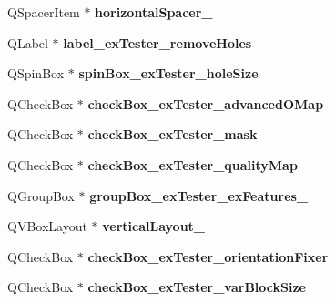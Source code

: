 \begin{DoxyCompactItemize}
\item 
\mbox{\label{class_ui___main_window_a8ab47ff95482ef95f4ec6ca4766b4f73}} 
Q\+Spacer\+Item $\ast$ {\bfseries horizontal\+Spacer\+\_}
\item 
\mbox{\label{class_ui___main_window_ad6729b2c4a64017c214cb48910162f0f}} 
Q\+Label $\ast$ {\bfseries label\+\_\+ex\+Tester\+\_\+remove\+Holes}
\item 
\mbox{\label{class_ui___main_window_a3288449518ceb42459d471718ca5e92b}} 
Q\+Spin\+Box $\ast$ {\bfseries spin\+Box\+\_\+ex\+Tester\+\_\+hole\+Size}
\item 
\mbox{\label{class_ui___main_window_ad98482ecaa124a0c9fc2b72c5a6f1ad9}} 
Q\+Check\+Box $\ast$ {\bfseries check\+Box\+\_\+ex\+Tester\+\_\+advanced\+O\+Map}
\item 
\mbox{\label{class_ui___main_window_ac1fab18b8ce7ae170b9061557cad4f64}} 
Q\+Check\+Box $\ast$ {\bfseries check\+Box\+\_\+ex\+Tester\+\_\+mask}
\item 
\mbox{\label{class_ui___main_window_a433098e655bc9777035b655b7f858b0c}} 
Q\+Check\+Box $\ast$ {\bfseries check\+Box\+\_\+ex\+Tester\+\_\+quality\+Map}
\item 
\mbox{\label{class_ui___main_window_ab6e537a8d2601e7a9c82979eacb39ca8}} 
Q\+Group\+Box $\ast$ {\bfseries group\+Box\+\_\+ex\+Tester\+\_\+ex\+Features\+\_}
\item 
\mbox{\label{class_ui___main_window_a94aafb885a8385761743b2f6a67781be}} 
Q\+V\+Box\+Layout $\ast$ {\bfseries vertical\+Layout\+\_}
\item 
\mbox{\label{class_ui___main_window_a04f76b915da4d82b74efa3c261925511}} 
Q\+Check\+Box $\ast$ {\bfseries check\+Box\+\_\+ex\+Tester\+\_\+orientation\+Fixer}
\item 
\mbox{\label{class_ui___main_window_a1896936ec1059b214f8e257a22a7c938}} 
Q\+Check\+Box $\ast$ {\bfseries check\+Box\+\_\+ex\+Tester\+\_\+var\+Block\+Size}

\end{DoxyCompactItemize}
